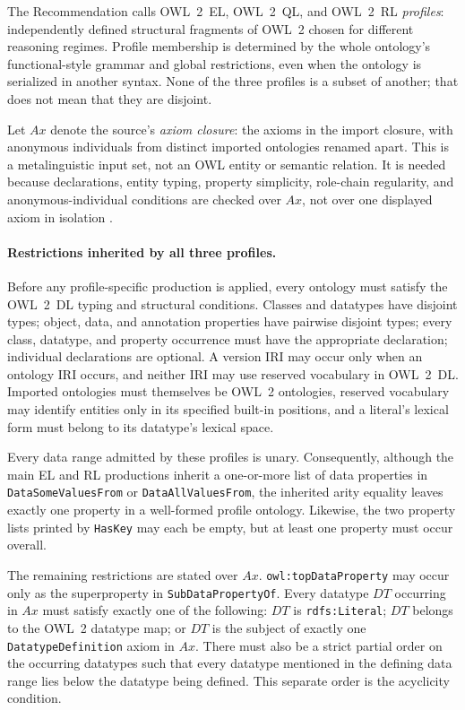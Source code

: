 The Recommendation calls OWL~2~EL, OWL~2~QL, and OWL~2~RL \emph{profiles}:
independently defined structural fragments of OWL~2 chosen for different
reasoning regimes.  Profile membership is determined by the whole ontology's
functional-style grammar and global restrictions, even when the ontology is
serialized in another syntax.  None of the three profiles is a subset of
another; that does not mean that they are disjoint.

Let \(Ax\) denote the source's \emph{axiom closure}: the axioms in the import
closure, with anonymous individuals from distinct imported ontologies renamed
apart.  This is a metalinguistic input set, not an OWL entity or semantic
relation.  It is needed because declarations, entity typing, property
simplicity, role-chain regularity, and anonymous-individual conditions are
checked over \(Ax\), not over one displayed axiom in isolation
\cite[\S1]{W3COWL2Profiles2012}
\cite[\S\S3.4 and~11]{W3COWL2Syntax2012}.

\paragraph{Restrictions inherited by all three profiles.}
Before any profile-specific production is applied, every ontology must satisfy
the OWL~2~DL typing and structural conditions.  Classes and datatypes have
disjoint types; object, data, and annotation properties have pairwise disjoint
types; every class, datatype, and property occurrence must have the appropriate
declaration; individual declarations are optional.  A version IRI may occur
only when an ontology IRI occurs, and neither IRI may use reserved vocabulary
in OWL~2~DL.  Imported ontologies must themselves be OWL~2 ontologies, reserved
vocabulary may identify entities only in its specified built-in positions, and
a literal's lexical form must belong to its datatype's lexical space.

Every data range admitted by these profiles is unary.  Consequently, although
the main EL and RL productions inherit a one-or-more list of data properties
in \texttt{DataSomeValuesFrom} or \texttt{DataAllValuesFrom}, the inherited
arity equality leaves exactly one property in a well-formed profile ontology.
Likewise, the two property lists printed by \texttt{HasKey} may each be empty,
but at least one property must occur overall.

The remaining restrictions are stated over \(Ax\).
\texttt{owl:topDataProperty} may occur only as the superproperty in
\texttt{SubDataPropertyOf}.  Every datatype \(DT\) occurring in \(Ax\) must
satisfy exactly one of the following: \(DT\) is \texttt{rdfs:Literal}; \(DT\)
belongs to the OWL~2 datatype map; or \(DT\) is the subject of exactly one
\texttt{DatatypeDefinition} axiom in \(Ax\).  There must also be a strict
partial order on the occurring datatypes such that every datatype mentioned in
the defining data range lies below the datatype being defined.  This separate
order is the acyclicity condition.

